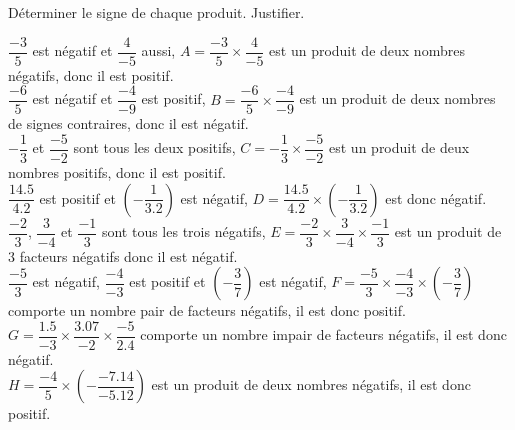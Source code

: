 \begin{corrige}
    Déterminer le signe de chaque produit. Justifier.

    {\red 
        \begin{spacing}{1.5}
            \begin{itemize}
                \def\item{}
                \item $\dfrac{-3}{5}$ est négatif et $\dfrac{4}{-5}$ aussi, $A=\dfrac{-3}{5}\times\dfrac{4}{-5}$ est un produit de deux nombres négatifs, donc il est positif.\\
                \item $\dfrac{-6}{5}$ est négatif et $\dfrac{-4}{-9}$ est positif, $B=\dfrac{-6}{5}\times\dfrac{-4}{-9}$ est un produit de deux nombres de signes contraires, donc il est négatif.\\
                \item $-\dfrac{1}{3}$ et $\dfrac{-5}{-2}$ sont tous les deux positifs, $C=-\dfrac{1}{3}\times\dfrac{-5}{-2}$ est un produit de deux nombres positifs, donc il est positif.\\
                \item $\dfrac{\num{14.5}}{\num{4.2}}$ est positif et $\left(-\dfrac{1}{\num{3.2}}\right)$ est négatif, $D=\dfrac{\num{14.5}}{\num{4.2}}\times\left(-\dfrac{1}{\num{3.2}}\right)$ est donc négatif.\\
                \item $\dfrac{-2}{3}$, $\dfrac{3}{-4}$ et $\dfrac{-1}{3}$ sont tous les trois négatifs, $E=\dfrac{-2}{3}\times\dfrac{3}{-4}\times\dfrac{-1}{3}$ est un produit de 3 facteurs négatifs donc il est négatif.\\
                \item $\dfrac{-5}{3}$ est négatif, $\dfrac{-4}{-3}$ est positif et $\left(-\dfrac{3}{7}\right)$ est négatif, $F=\dfrac{-5}{3}\times\dfrac{-4}{-3}\times\left(-\dfrac{3}{7}\right)$ comporte un nombre pair de facteurs négatifs, il est donc positif.\\
                \item $G=\dfrac{\num{1.5}}{-3}\times\dfrac{\num{3.07}}{-2}\times\dfrac{-5}{\num{2.4}}$ comporte un nombre impair de facteurs négatifs, il est donc négatif.\\
                \item $H=\dfrac{-4}{5}\times\left(-\dfrac{\num{-7.14}}{\num{-5.12}}\right)$ est un produit de deux nombres négatifs, il est donc positif.
            \end{itemize}
        \end{spacing}
    }
\end{corrige}

